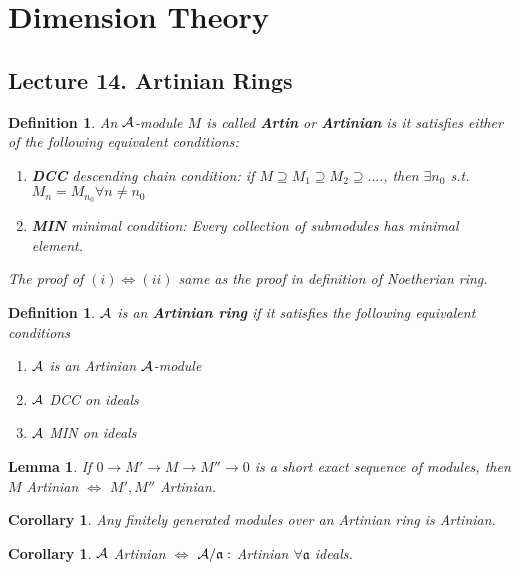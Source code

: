 \documentclass[11pt]{article}
\newtheorem{lemma}[thm]{Lemma}
\newtheorem{cor}[thm]{Corollary}
\newtheorem{dfn}[thm]{Definition}
\newcommand{\sca}{{\mathfrak a}}
\newcommand{\cala}{{\cal A}}
\newcommand{\lrta}{\longrightarrow}
\newcommand{\Llrta}{\Longleftrightarrow}
\begin{document}
\section{Dimension Theory}

\subsection{Lecture 14. Artinian   Rings}
\begin{dfn}
An $\cala$-module $M$ is called \textbf{Artin} or \textbf{Artinian} is it satisfies either of the following equivalent conditions:
\begin{enumerate}[label=(\roman*)]
\item \textbf{DCC} descending chain condition: if $M\supseteq M_1\supseteq M_2\supseteq ....$, then $\exists n_0$ s.t. $M_n=M_{n_0}\forall n\neq n_0$
\item \textbf{MIN} minimal condition: Every collection of submodules has minimal element.
\end{enumerate}
The proof of $(i)\Llrta (ii)$ same as the proof in definition of Noetherian ring.
\end{dfn}

\begin{dfn}
$\cala$ is an \textbf{Artinian ring } if it satisfies the following equivalent conditions
\begin{enumerate}[label=(\roman*)]
\item $\cala$ is an Artinian   $\cala$-module
\item $\cala$ DCC on ideals
\item $\cala$ MIN on ideals
\end{enumerate}
\end{dfn}

\begin{lemma}\label{lem:SES_Artin}
If $0\lrta M'\lrta M\lrta M''\lrta 0$ is a short exact sequence of modules, then $M$ Artinian   $\Llrta$ $M', M''$ Artinian. 
\end{lemma}
\begin{cor}
Any finitely generated modules over an Artinian   ring is Artinian. 
\end{cor}
\begin{cor}
$\cala$ Artinian   $\Llrta $ $\cala/\sca:$ Artinian   $\forall \sca$ ideals.
\end{cor}
\end{document}
